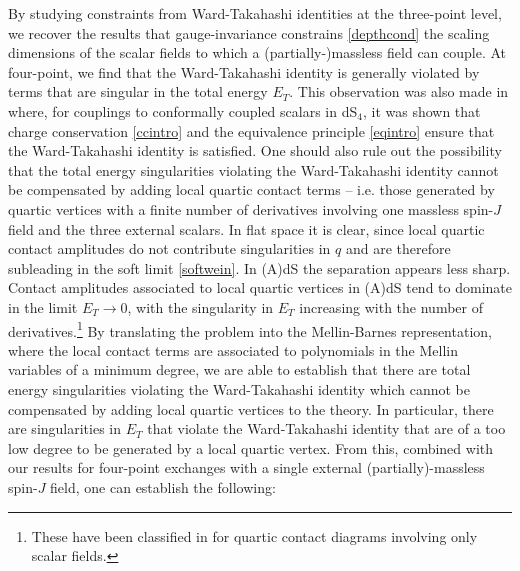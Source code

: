 \documentclass[11pt,a4paper]{article}
\begin{document}
By studying constraints from Ward-Takahashi identities at the three-point level, we recover the results \cite{Joung:2012rv,Joung:2012hz} that gauge-invariance constrains \eqref{depthcond} the scaling dimensions of the scalar fields to which a (partially-)massless field can couple. At four-point, we find that the Ward-Takahashi identity is generally violated by terms that are singular in the total energy $E_T$. This observation was also made in \cite{Baumann:2020dch} where, for couplings to conformally coupled scalars in dS$_4$, it was shown that charge conservation \eqref{ccintro} and the equivalence principle \eqref{eqintro} ensure that the Ward-Takahashi identity is satisfied. One should also rule out the possibility that the total energy singularities violating the Ward-Takahashi identity cannot be compensated by adding local quartic contact terms -- i.e. those generated by quartic vertices with a finite number of derivatives involving one massless spin-$J$ field and the three external scalars. In flat space it is clear, since local quartic contact amplitudes do not contribute singularities in $q$ and are therefore subleading in the soft limit \eqref{softwein}. In (A)dS the separation appears less sharp. Contact amplitudes associated to local quartic vertices in (A)dS tend to dominate in the limit $E_T \to 0$, with the singularity in $E_T$ increasing with the number of derivatives.\footnote{These have been classified in \cite{Arkani-Hamed:2018kmz} for quartic contact diagrams involving only scalar fields.} 
By translating the problem into the Mellin-Barnes representation, where the local contact terms are associated to polynomials in the Mellin variables of a minimum degree, we are able to establish that there are total energy singularities violating the Ward-Takahashi identity which cannot be compensated by adding local quartic vertices to the theory. In particular, there are singularities in $E_T$ that violate the Ward-Takahashi identity that are of a too low degree to be generated by a local quartic vertex. From this, combined with our results for four-point exchanges with a single external (partially)-massless spin-$J$ field, one can establish the following:
\end{document}
